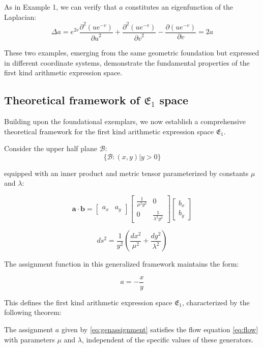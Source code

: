 As in Example 1, we can verify that $a$ constitutes an eigenfunction of the Laplacian:
$$
\Delta a = e^{2v} \frac{\partial^2(u e^{-v})}{{\partial u}^2} + \frac{\partial^2(u e^{-v})}{{\partial v}^2} - \frac{\partial(u e^{-v})}{\partial v} = 2a
$$

These two examples, emerging from the same geometric foundation but expressed in different coordinate systems, demonstrate the fundamental properties of the first kind arithmetic expression space.

\subsection{Theoretical framework of $\mathfrak{E}_1$ space}\label{subsec:generalframework}

Building upon the foundational exemplars, we now establish a comprehensive theoretical framework for the first kind arithmetic expression space $\mathfrak{E}_1$. 

Consider the upper half plane $\mathcal{B}$:
$$
\{\mathcal{B}: (x, y) | y > 0 \}
$$

equipped with an inner product and metric tensor parameterized by constants $\mu$ and $\lambda$:

$$
\mathbf{a} \cdot \mathbf{b} = \begin{bmatrix} a_x & a_y \end{bmatrix} \begin{bmatrix} \frac{1}{\mu^2 y^2} & 0 \\ 0 & \frac{1}{\lambda^2 y^2} \end{bmatrix} \begin{bmatrix} b_x \\ b_y \end{bmatrix}
$$

$$
ds^2 = \frac{1}{y^2}\left(\frac{dx^2}{\mu^2} + \frac{dy^2}{\lambda^2}\right)
$$

The assignment function in this generalized framework maintains the form:

\begin{equation}\label{eq:genassignment}
a = - \frac{x}{y}
\end{equation}

This defines the first kind arithmetic expression space $\mathfrak{E}_1$, characterized by the following theorem:

\begin{theorem}\label{thm:generalE1}
The assignment $a$ given by \eqref{eq:genassignment} satisfies the flow equation \eqref{eq:flow} with parameters $\mu$ and $\lambda$, independent of the specific values of these generators.
\end{theorem}

